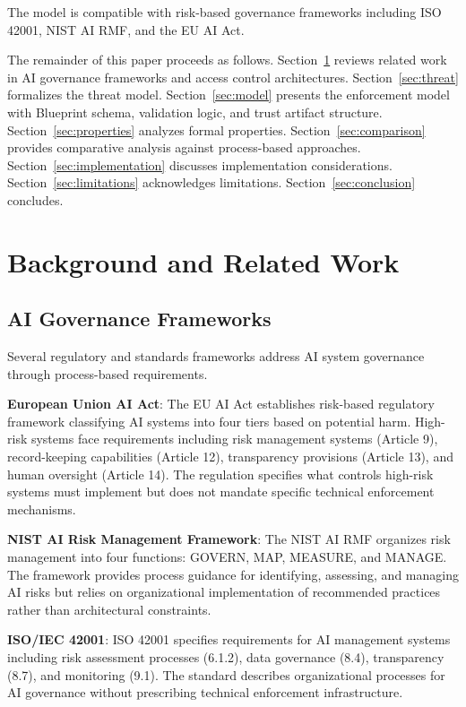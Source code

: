 \documentclass[11pt,letterpaper]{article}
\begin{document}
The model is compatible with risk-based governance frameworks including ISO 42001, NIST AI RMF, and the EU AI Act.

The remainder of this paper proceeds as follows. Section~\ref{sec:background} reviews related work in AI governance frameworks and access control architectures. Section~\ref{sec:threat} formalizes the threat model. Section~\ref{sec:model} presents the enforcement model with Blueprint schema, validation logic, and trust artifact structure. Section~\ref{sec:properties} analyzes formal properties. Section~\ref{sec:comparison} provides comparative analysis against process-based approaches. Section~\ref{sec:implementation} discusses implementation considerations. Section~\ref{sec:limitations} acknowledges limitations. Section~\ref{sec:conclusion} concludes.

\section{Background and Related Work}
\label{sec:background}

\subsection{AI Governance Frameworks}

Several regulatory and standards frameworks address AI system governance through process-based requirements.

\textbf{European Union AI Act}: The EU AI Act \cite{eu_ai_act} establishes risk-based regulatory framework classifying AI systems into four tiers based on potential harm. High-risk systems face requirements including risk management systems (Article 9), record-keeping capabilities (Article 12), transparency provisions (Article 13), and human oversight (Article 14). The regulation specifies what controls high-risk systems must implement but does not mandate specific technical enforcement mechanisms.

\textbf{NIST AI Risk Management Framework}: The NIST AI RMF \cite{nist_ai_rmf} organizes risk management into four functions: GOVERN, MAP, MEASURE, and MANAGE. The framework provides process guidance for identifying, assessing, and managing AI risks but relies on organizational implementation of recommended practices rather than architectural constraints.

\textbf{ISO/IEC 42001}: ISO 42001 \cite{iso_42001} specifies requirements for AI management systems including risk assessment processes (6.1.2), data governance (8.4), transparency (8.7), and monitoring (9.1). The standard describes organizational processes for AI governance without prescribing technical enforcement infrastructure.
\end{document}
